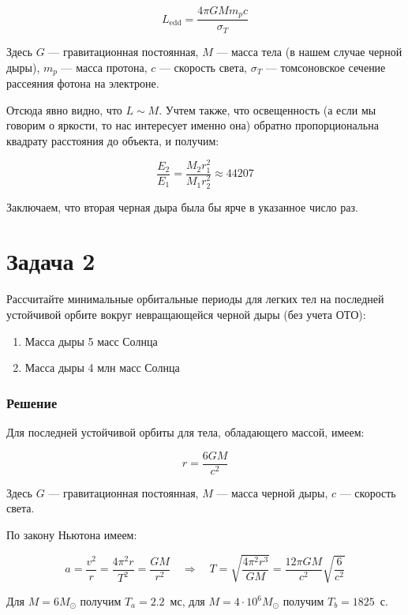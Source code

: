 \documentclass[a4paper, 12pt]{article}
\newcommand{\RN}[1]
{\MakeUppercase{\romannumeral #1}} %
\newcommand{\qrq}
{\ensuremath{\quad \Rightarrow \quad}} %
\begin{document}
\begin{equation}
	L_{\text{edd}} = \frac{4 \pi G M m_p c}{\sigma_T}
\end{equation}

Здесь $G$ --- гравитационная постоянная, $M$ --- масса тела (в нашем случае черной дыры), $m_p$ --- масса протона, $c$ --- скорость света, $\sigma_T$ --- томсоновское сечение рассеяния фотона на электроне.

Отсюда явно видно, что $L \sim M$. Учтем также, что освещенность (а если мы говорим о яркости, то нас интересует именно она) обратно пропорциональна квадрату расстояния до объекта, и получим:

\begin{equation}
	\boxed{\frac{E_2}{E_1} = \frac{M_2 r_1^2}{M_1 r_2^2} \approx 44207}
\end{equation}

Заключаем, что вторая черная дыра была бы ярче в указанное число раз.

\section*{Задача 2}

Рассчитайте минимальные орбитальные периоды для легких тел на последней устойчивой орбите вокруг невращающейся черной дыры (без учета ОТО):

\begin{enumerate}[label=\alph*)]
	\item Масса дыры 5 масс Солнца
	
	\item Масса дыры 4 млн масс Солнца
\end{enumerate}

\subsubsection*{Решение}

Для последней устойчивой орбиты для тела, обладающего массой, имеем:

\begin{equation}
	r = \frac{6 GM}{c^2}
\end{equation}

Здесь $G$ --- гравитационная постоянная, $M$ --- масса черной дыры, $c$ --- скорость света.

По \RN{2} закону Ньютона имеем:

\begin{equation}
	a = \frac{v^2}{r} = \frac{4 \pi ^ 2 r}{T^2} = \frac{G M}{r^2} \qrq T = \sqrt{\frac{4 \pi ^2 r^3}{G M}} = \frac{12 \pi G M}{c^2} \sqrt{\frac{ 6}{c^2}}
\end{equation}

Для $M = 6 M_{\odot}$ получим $T_a = 2.2$~мс, для $M = 4 \cdot 10^6 M_{\odot}$ получим $T_b = 1825$~с.
\end{document}
